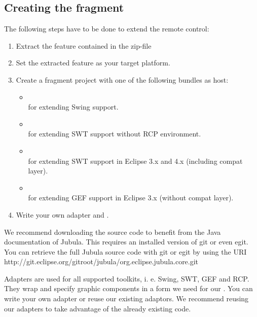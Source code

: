 \subsection{Creating the fragment}

The following steps have to be done to extend the \app{} remote control:

\begin{enumerate}
  \item Extract the feature contained in the zip-file\\
  \item Set the extracted feature as your target platform.
  \item Create a fragment project with one of the following bundles as host:
    \begin{itemize}
      \item {}\\
            for extending Swing support.
      \item {}\\
            for extending SWT support without RCP environment.
      \item {}\\
            for extending SWT support in Eclipse 3.x and 4.x (including compat
            layer).
      \item {}\\
            for extending GEF support in Eclipse 3.x (without compat
            layer).
   \end{itemize}
  \item Write your own adapter and \gdtesterclasses.
\end{enumerate}

We recommend downloading the source code to benefit from the Java
documentation of Jubula. This requires an installed version of git or even egit.
You can retrieve the full Jubula source code with git or egit by using the URI\\
http://git.eclipse.org/gitroot/jubula/org.eclipse.jubula.core.git

Adapters are used for all supported toolkits, i. e. Swing, SWT, GEF and RCP.
They wrap and specify graphic components in a form we need for our
\gdtesterclasses. You can write your own adapter or reuse our existing
adaptors. We recommend reusing our adapters to take advantage of the already
existing code.

